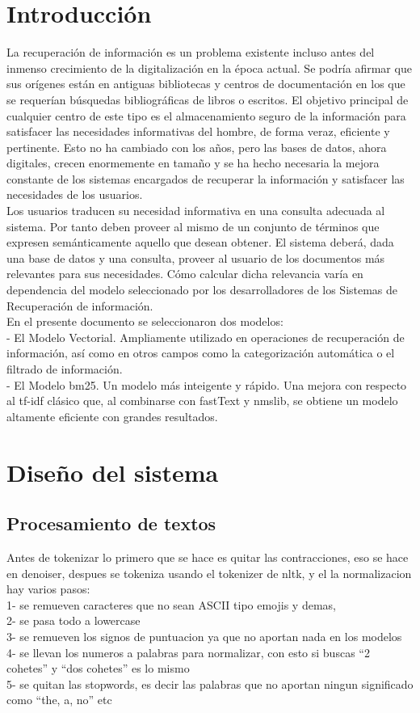 \documentclass[runningheads,a4paper]{llncs}
\begin{document}
\section{Introducción}
La recuperación de información es un problema existente incluso antes del inmenso crecimiento de la digitalización en la época actual. Se podría afirmar que sus orígenes están en antiguas bibliotecas y centros de documentación en los que se requerían búsquedas bibliográficas de libros o escritos. El objetivo principal de cualquier centro de este tipo es el almacenamiento seguro de la información para satisfacer las necesidades informativas del hombre, de forma veraz, eficiente y pertinente. Esto no ha cambiado con los años, pero las bases de datos, ahora digitales, crecen enormemente en tamaño y se ha hecho necesaria la mejora constante de los sistemas encargados de recuperar la información y satisfacer las necesidades de los usuarios. \\
Los usuarios traducen su necesidad informativa en una consulta adecuada al sistema. Por tanto deben proveer al mismo de un conjunto de términos que expresen semánticamente aquello que desean obtener. El sistema deberá, dada una base de datos y una consulta, proveer al usuario de los documentos más relevantes para sus necesidades. Cómo calcular dicha relevancia varía en dependencia del modelo seleccionado por los desarrolladores de los Sistemas de Recuperación de información.\\
En el presente documento se seleccionaron dos modelos:\\
- El Modelo Vectorial. Ampliamente utilizado en operaciones de recuperación de información, así como en otros campos como la categorización automática o el filtrado de información.\\
- El Modelo bm25. Un modelo más inteigente y rápido. Una mejora con respecto al tf-idf clásico que, al combinarse con fastText y nmslib, se obtiene un modelo altamente eficiente con grandes resultados.


\section{Diseño del sistema}

\subsection*{Procesamiento de textos}
Antes de tokenizar lo primero que se hace es quitar las contracciones, eso se hace en denoiser, despues se tokeniza usando el tokenizer de nltk, y el la normalizacion hay varios pasos:\\
1- se remueven caracteres que no sean ASCII tipo emojis y demas,\\
2- se pasa todo a lowercase\\
3- se remueven los signos de puntuacion ya que no aportan nada en los modelos\\
4- se llevan los numeros a palabras para normalizar, con esto si buscas “2 cohetes” y “dos cohetes” es lo mismo\\
5- se quitan las stopwords, es decir las palabras que no aportan ningun significado como “the, a, no” etc\\
\end{document}
